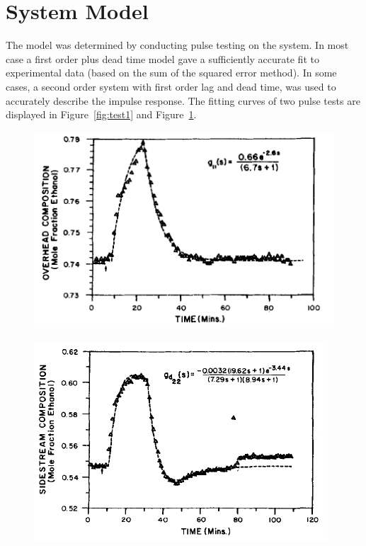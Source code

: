 \documentclass[a4paper,12pt]{article}
\begin{document}
\newpage
\section{System Model}

The model was determined by conducting pulse testing on the system. In most case a first order plus dead time model gave a sufficiently accurate fit to experimental data (based on the sum of the squared error method). In some cases, a second order system with first order lag and dead time, was used to accurately describe the impulse response. The fitting curves of two pulse tests are displayed in Figure~\ref{fig:test1} and Figure~\ref{fig:test2}.

\begin{figure}[htbp]
	\centering
	\begin{minipage}{.48\textwidth}
		\centering
		\includegraphics[width=\linewidth]{Figures/Pulse_test_1}
		\label{fig:test1}
	\end{minipage}%
	\hfill
	\begin{minipage}{.48\textwidth}
		\centering
		\includegraphics[width=\linewidth]{Figures/Pulse_test_2}
		\label{fig:test2}
	\end{minipage}
\end{figure}
\end{document}
